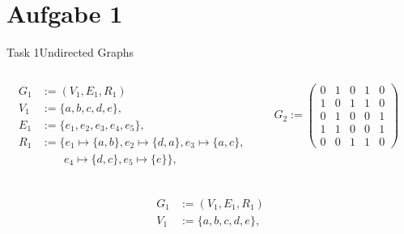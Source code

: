 
\section{Aufgabe 1}

\setcounter{task}{1}

\begin{frame}[allowframebreaks]{Task 1}{Undirected Graphs}
  \begin{requirementsnoinc}
    \begin{columns}
      \begin{column}{0.6\textwidth}
        \centering
        \begin{align*}
          G_1 &:= (V_1, E_1, R_1)\\
          V_1 &:= \{a, b, c, d, e\},\\
          E_1 &:= \{e_1, e_2, e_3, e_4, e_5\},\\
          R_1 &:= \{e_1 \mapsto \{a, b\} , e_2 \mapsto \{d, a\}, e_3 \mapsto \{a, c\},\\\ & \qquad e_4 \mapsto \{d, c\}, e_5 \mapsto \{e\}\},\\
        \end{align*}
      \end{column}
      \begin{column}{0.4\textwidth}
        \centering
        $G_2 :=
        \begin{pmatrix}
        0 & 1 & 0 & 1 & 0 \\
        1 & 0 & 1 & 1 & 0 \\
        0 & 1 & 0 & 0 & 1 \\
        1 & 1 & 0 & 0 & 1 \\
        0 & 0 & 1 & 1 & 0
        \end{pmatrix}$
      \end{column}
    \end{columns}
  \end{requirementsnoinc}
  \begin{solutionnoinc}
    \begin{columns}
      \begin{column}{0.6\textwidth}
        \centering
        \begin{align*}
          G_1 &:= (V_1, E_1, R_1)\\
          V_1 &:= \{a, b, c, d, e\},\\

\end{align*}
\end{column}
\end{columns}
\end{solutionnoinc}
\end{frame}
